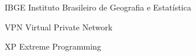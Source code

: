 \begin{siglas}
  \item[IBGE] Instituto Brasileiro de Geografia e Estatística
  \item[VPN] Virtual Private Network
  \item [XP] Extreme Programming
\end{siglas}
